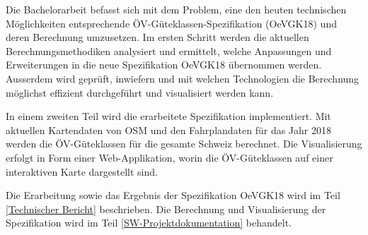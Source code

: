 Die Bachelorarbeit befasst sich mit dem Problem, eine den heuten technischen Möglichkeiten entsprechende \acs{ÖV}-Güteklassen-Spezifikation (\gls{OeVGK18}) und deren Berechnung umzusetzen.
Im ersten Schritt werden die aktuellen Berechnungsmethodiken analysiert und ermittelt, welche Anpassungen und Erweiterungen in die neue Spezifikation \gls{OeVGK18} übernommen werden.
Ausserdem wird geprüft, inwiefern und mit welchen Technologien die Berechnung möglichst effizient durchgeführt und visualisiert werden kann.

In einem zweiten Teil wird die erarbeitete Spezifikation implementiert.
Mit aktuellen Kartendaten von \ac{OSM} und den Fahrplandaten für das Jahr 2018 werden die \acs{ÖV}-Güteklassen für die gesamte Schweiz berechnet.
Die Visualisierung erfolgt in Form einer Web-Applikation, worin die \acs{ÖV}-Güteklassen auf einer interaktiven Karte dargestellt sind.

Die Erarbeitung sowie das Ergebnis der Spezifikation \gls{OeVGK18} wird im Teil \ref{Technischer Bericht} beschrieben.
Die Berechnung und Visualisierung der Spezifikation wird im Teil \ref{SW-Projektdokumentation} behandelt.
